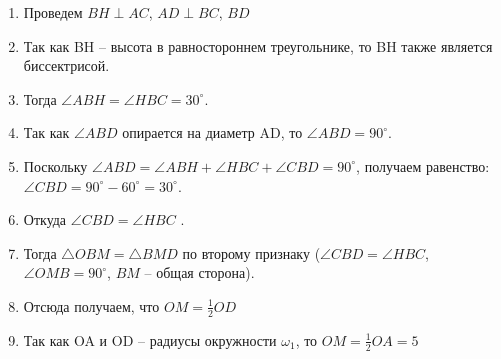 \begin{enumerate}
\item Проведем $BH \perp AC$, $AD \perp BC$, $BD$
\begin{figure}[h]
\end{figure}

\item Так как BH -- высота в равностороннем треугольнике, то BH также является биссектрисой.
\item Тогда $\angle ABH = \angle HBC =30^\circ$.
\item Так как $\angle ABD$ опирается на диаметр AD, то $\angle ABD=90^\circ$.
\item Поскольку $\angle ABD=\angle ABH+\angle HBC + \angle CBD = 90^\circ$, получаем равенство: $\angle CBD = 90^\circ -60^\circ=30^\circ $.
\item Откуда $\angle CBD = \angle HBC$ .
\item Тогда $\triangle OBM = \triangle BMD$ по второму признаку ($\angle CBD = \angle HBC$, $\angle OMB = 90^\circ$, $BM$ -- общая сторона).
\item Отсюда получаем, что $OM = \frac{1}{2}OD$
\item Так как OA и OD -- радиусы окружности $\omega_1$, то $OM = \frac{1}{2}OA=5$
\end{enumerate}


